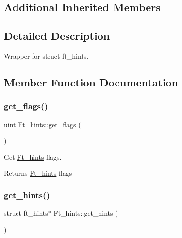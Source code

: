 \subsection*{Additional Inherited Members}


\subsection{Detailed Description}
Wrapper for struct ft\+\_\+hints. 

\subsection{Member Function Documentation}
\mbox{\label{classFt__hints_afc422006ae4edfc400ad6e84afca280b}} 
\subsubsection{\texorpdfstring{get\+\_\+flags()}{get\_flags()}}
{\footnotesize\ttfamily uint Ft\+\_\+hints\+::get\+\_\+flags (\begin{DoxyParamCaption}{ }\end{DoxyParamCaption})\hspace{0.3cm}{\ttfamily [inline]}}

Get \mbox{\hyperlink{classFt__hints}{Ft\+\_\+hints}} flags.

\begin{DoxyReturn}{Returns}
\mbox{\hyperlink{classFt__hints}{Ft\+\_\+hints}} flags 
\end{DoxyReturn}
\mbox{\label{classFt__hints_a35d5cea0394840c738b26fae283fba71}} 
\subsubsection{\texorpdfstring{get\+\_\+hints()}{get\_hints()}}
{\footnotesize\ttfamily struct ft\+\_\+hints$\ast$ Ft\+\_\+hints\+::get\+\_\+hints (\begin{DoxyParamCaption}{ }\end{DoxyParamCaption})\hspace{0.3cm}{\ttfamily [inline]}}

